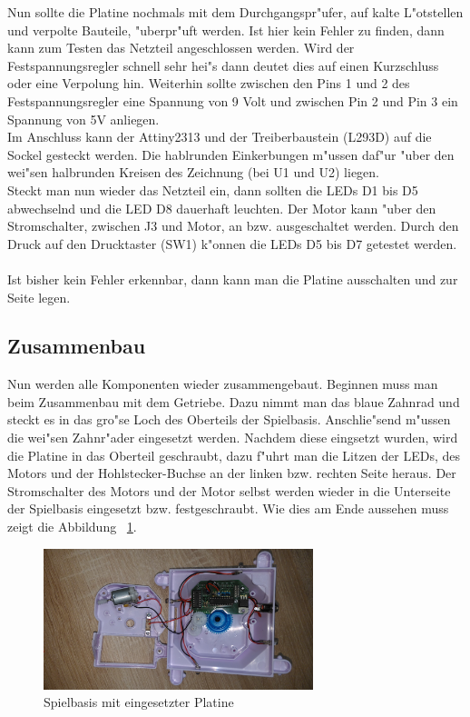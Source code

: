 Nun sollte die Platine nochmals mit dem Durchgangspr"ufer, auf kalte L"otstellen und verpolte Bauteile, "uberpr"uft werden. Ist hier kein Fehler zu finden, dann kann zum Testen das Netzteil angeschlossen werden. Wird der Festspannungsregler schnell sehr hei"s dann deutet dies auf einen Kurzschluss oder eine Verpolung hin. Weiterhin sollte zwischen den Pins 1 und 2 des Festspannungsregler eine Spannung von 9 Volt und zwischen Pin 2 und Pin 3 ein Spannung von 5V anliegen. \\

Im Anschluss kann der Attiny2313 und der Treiberbaustein (L293D) auf die Sockel gesteckt werden. Die hablrunden Einkerbungen m"ussen daf"ur "uber den wei"sen halbrunden Kreisen des Zeichnung (bei U1 und U2) liegen. \\

Steckt man nun wieder das Netzteil ein, dann sollten die LEDs D1 bis D5 abwechselnd und die LED D8 dauerhaft leuchten. Der Motor kann "uber den Stromschalter, zwischen J3 und Motor, an bzw. ausgeschaltet werden.
Durch den Druck auf den Drucktaster (SW1) k"onnen die LEDs D5 bis D7 getestet werden. \\
\\
Ist bisher kein Fehler erkennbar, dann kann man die Platine ausschalten und zur Seite legen.
 

\newpage
\subsection{Zusammenbau}

Nun werden alle Komponenten wieder zusammengebaut.
Beginnen muss man beim Zusammenbau mit dem Getriebe. Dazu nimmt man das blaue Zahnrad und steckt es in das gro"se Loch des Oberteils der Spielbasis. Anschlie"send m"ussen die wei"sen Zahnr"ader eingesetzt werden. Nachdem diese eingsetzt wurden, wird die Platine in das Oberteil geschraubt, dazu f"uhrt man die Litzen der LEDs, des Motors und der Hohlstecker-Buchse an der linken bzw. rechten Seite heraus. Der Stromschalter des Motors und der Motor selbst werden wieder in die Unterseite der Spielbasis eingesetzt bzw. festgeschraubt. Wie dies am Ende aussehen muss zeigt die Abbildung ~\ref{fig23}.

\vspace{0.5cm}
\begin{figure}[!ht]
	\centering
  	\includegraphics[width=0.7\textwidth]{pictures/loolou_023.jpg}
	\caption{Spielbasis mit eingesetzter Platine}
	\label{fig23}
\end{figure}
\vspace{0.5cm} 

